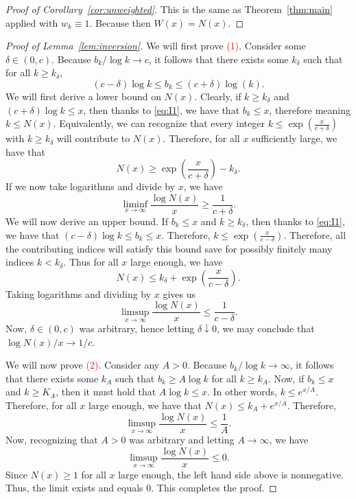 \documentclass{article}
\theoremstyle{definition}
\begin{document}
\begin{proof}[Proof of Corollary~\ref{cor:unweighted}]
This is the same as Theorem~\ref{thm:main} applied with $w_k\equiv 1$. Because then $W(x)=N(x)$.    
\end{proof}

\begin{proof}[Proof of Lemma~\ref{lem:inversion}]
We will first prove \textcolor{red}{(1)}. Consider some $\delta\in(0,c)$. Because $b_k/\log k\to c$, it follows that there exists some $k_{\delta}$ such that for all $k\ge k_{\delta}$,
\begin{equation}\label{eq:I1}
(c-\delta)\log k\le b_k\le (c+\delta)\log(k).  
\end{equation}
We will first derive a lower bound on $N(x)$. Clearly, if $k\ge k_{\delta}$ and $(c+\delta)\log k\le x$, then thanks to \eqref{eq:I1}, we have that $b_k\le x$, therefore meaning $k\le N(x)$. Equivalently, we can recognize that every integer $k\le \exp\left(\frac{x}{c+\delta}\right)$ with $k\ge k_{\delta}$ will contribute to $N(x)$. Therefore, for all $x$ sufficiently large, we have that 
\[
N(x)\ge \exp\left(\frac{x}{c+\delta}\right)-k_{\delta}.
\]
If we now take logarithms and divide by $x$, we have
\[
\liminf_{x\to\infty}\frac{\log N(x)}{x}\ge\frac{1}{c+\delta}.
\]
We will now derive an upper bound. If $b_k\le x$ and $k\ge k_{\delta}$, then thanks to \eqref{eq:I1}, we have that $(c-\delta)\log k\le b_k\le x$. Therefore, $k\le \exp\left(\frac{x}{c-\delta}\right)$. Therefore, all the contributing indices will satisfy this bound save for possibly finitely many indices $k<k_{\delta}$. Thus for all $x$ large enough, we have
\[
N(x)\le k_{\delta} + \exp\left(\frac{x}{c-\delta}\right).
\]
Taking logarithms and dividing by $x$ gives us
\[
\limsup_{x\to\infty}\frac{\log N(x)}{x}\le \frac{1}{c-\delta}.
\]
Now, $\delta\in(0,c)$ was arbitrary, hence letting $\delta\downarrow 0$, we may conclude that $\log N(x)/x \to 1/c$.

We will now prove \textcolor{red}{(2)}. Consider any $A>0$. Because $b_k/\log k\to \infty$, it follows that there exists some $k_A$ such that $b_k\ge A\log k$ for all $k\ge k_A$. Now, if $b_k\le x$ and $k\ge K_A$, then it must hold that $A\log k\le x$. In other words, $k\le e^{x/A}$. Therefore, for all $x$ large enough, we have that $N(x)\le k_A + e^{x/A}$. Therefore,
\[
\limsup_{x\to\infty}\frac{\log N(x)}{x}\le \frac{1}{A}.
\]
Now, recognizing that $A>0$ was arbitrary and letting $A\to\infty$, we have
\[
\limsup_{x\to\infty}\frac{\log N(x)}{x}\le 0.
\]
Since $N(x)\ge 1$ for all $x$ large enough, the left hand side above is nonnegative. Thus, the limit exists and equals $0$. This completes the proof.
\end{proof}
\end{document}
